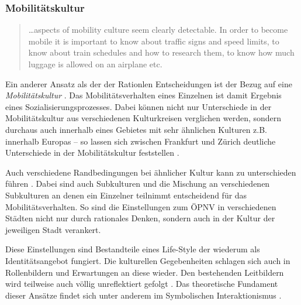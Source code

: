 \subsubsection*{Mobilitätskultur}
\begin{quote}
	\dots aspects of mobility culture seem clearly detectable. In order to become mobile it is
important to know about traffic signs and speed limits, to know about train schedules and how
to research them, to know how much luggage is allowed on an airplane etc. \emph{\parencite[24]{widmer}}
\end{quote}

Ein anderer Ansatz als der der Rationlen Entscheidungen ist der Bezug auf eine \emph{Mobilitätskultur} \parencite[22 f.][6 ff.]{widmer, fh7}.
Das Mobilitätsverhalten eines Einzelnen ist damit Ergebnis eines Sozialisierungsprozesses.
Dabei können nicht nur Unterschiede in der Mobilitätskultur aus verschiedenen Kulturkreisen verglichen werden, sondern durchaus auch innerhalb eines Gebietes mit sehr ähnlichen Kulturen z.B. innerhalb Europas – so lassen sich zwischen Frankfurt und Zürich deutliche Unterschiede in der Mobilitätskultur feststellen \parencite{fh7}.

Auch verschiedene Randbedingungen bei ähnlicher Kultur kann zu unterschieden führen \parencite[24]{widmer}.
Dabei sind auch Subkulturen und die Mischung an verschiedenen Subkulturen an denen ein Einzelner teilnimmt entscheidend für das Mobilitätsverhalten.
So sind die Einstellungen zum ÖPNV in verschiedenen Städten nicht nur durch rationales Denken, sondern auch in der Kultur der jeweiligen Stadt verankert.

Diese Einstellungen sind Bestandteile eines Life-Style \parencite[24 f.]{widmer} der wiederum als Identitätsangebot fungiert.
Die kulturellen Gegebenheiten schlagen sich auch in Rollenbildern und Erwartungen an diese wieder.
Den bestehenden Leitbildern wird teilweise auch völlig unreflektiert gefolgt \parencite[27]{widmer}.
Das theoretische Fundament dieser Ansätze findet sich unter anderem im Symbolischen Interaktionismus \parencite[27][14 ff.]{widmer, schulz}.
